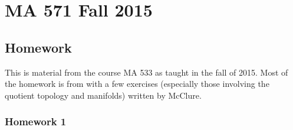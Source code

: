 \chapter{MA 571 Fall 2015}
\thispagestyle{empty}
\bigskip
\section{Homework}
This is material from the course MA 533 as taught in the fall of 2015.
Most of the homework is from \cite{munkres} with a few exercises
(especially those involving the quotient topology and manifolds) written by
McClure.
\subsection{Homework 1}

